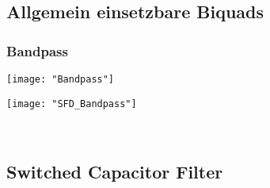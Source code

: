 
\subsection{Allgemein einsetzbare Biquads}
\subsubsection{Bandpass}
\begin{minipage}[t]{0.45\textwidth}
	\vspace{0pt}
	\texttt{[image: "Bandpass"]}
\end{minipage}\hspace{0.05\textwidth}
\begin{minipage}[t]{0.45\textwidth}
	\vspace{0pt}
	\texttt{[image: "SFD\_Bandpass"]}
\end{minipage}\\
\begin{minipage}[t]{\textwidth}
	\vspace{0pt}
	\centering
\end{minipage}
\vspace{2mm}



\subsection{Switched Capacitor Filter}
	
	

